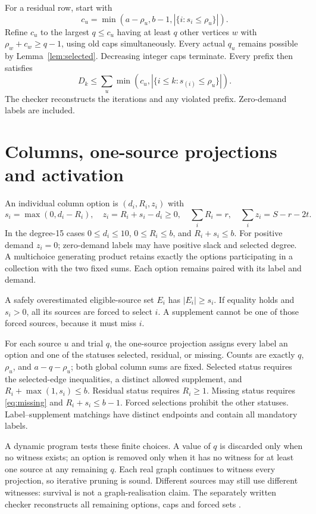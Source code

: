 \documentclass[11pt,a4paper]{article}
\begin{document}
For a residual row, start with
\[
 c_u=\min(a-\rho_u,b-1,|\{i:s_i\le\rho_u\}|).
\]
Refine $c_u$ to the largest $q\le c_u$ having at least $q$ other vertices $w$ with $\rho_w+c_w\ge q-1$, using old caps simultaneously. Every actual $q_u$ remains possible by Lemma~\ref{lem:selected}. Decreasing integer caps terminate. Every prefix then satisfies
\begin{equation}\label{eq:prefix}
 D_k\le\sum_u\min(c_u,|\{i\le k:s_{(i)}\le\rho_u\}|).
\end{equation}
The checker reconstructs the iterations and any violated prefix. Zero-demand labels are included.

\section{Columns, one-source projections and activation}\label{sec:columns}
An individual column option is $(d_i,R_i,z_i)$ with
\[
 s_i=\max(0,d_i-R_i),\quad z_i=R_i+s_i-d_i\ge0,\quad
 \sum_iR_i=r,\quad\sum_i z_i=S-r-2t.
\]
In the degree-15 cases $0\le d_i\le10$, $0\le R_i\le b$, and $R_i+s_i\le b$. For positive demand $z_i=0$; zero-demand labels may have positive slack and selected degree. A multichoice generating product retains exactly the options participating in a collection with the two fixed sums. Each option remains paired with its label and demand.

A safely overestimated eligible-source set $E_i$ has $|E_i|\ge s_i$. If equality holds and $s_i>0$, all its sources are forced to select $i$. A supplement cannot be one of those forced sources, because it must miss $i$.

For each source $u$ and trial $q$, the one-source projection assigns every label an option and one of the statuses selected, residual, or missing. Counts are exactly $q$, $\rho_u$, and $a-q-\rho_u$; both global column sums are fixed. Selected status requires the selected-edge inequalities, a distinct allowed supplement, and $R_i+\max(1,s_i)\le b$. Residual status requires $R_i\ge1$. Missing status requires \eqref{eq:missing} and $R_i+s_i\le b-1$. Forced selections prohibit the other statuses. Label--supplement matchings have distinct endpoints and contain all mandatory labels.

A dynamic program tests these finite choices. A value of $q$ is discarded only when no witness exists; an option is removed only when it has no witness for at least one source at any remaining $q$. Each real graph continues to witness every projection, so iterative pruning is sound. Different sources may still use different witnesses: survival is not a graph-realisation claim. The separately written checker reconstructs all remaining options, caps and forced sets \cite{v5}.
\end{document}
